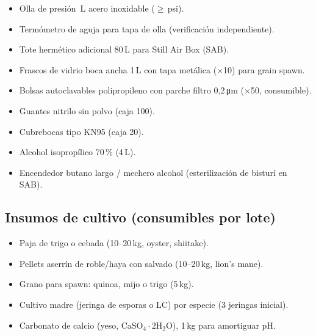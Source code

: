 \begin{itemize}[leftmargin=*,itemsep=0pt]
  \item Olla de presión \paramVolOllaPresion\,L acero inoxidable
        ($\geq$\paramPresionEster\,psi).
  \item Termómetro de aguja para tapa de olla (verificación independiente).
  \item Tote hermético adicional 80\,L para Still Air Box (SAB).
  \item Frascos de vidrio boca ancha 1\,L con tapa metálica ($\times$10)
        para grain spawn.
  \item Bolsas autoclavables polipropileno con parche filtro 0{,}2\,\si{\micro\meter}
        ($\times$50, consumible).
  \item Guantes nitrilo sin polvo (caja 100).
  \item Cubrebocas tipo KN95 (caja 20).
  \item Alcohol isopropílico 70\,\% (4\,L).
  \item Encendedor butano largo / mechero alcohol (esterilización
        de bisturí en SAB).
\end{itemize}

\subsection{Insumos de cultivo (consumibles por lote)}
\label{sec:bom:insumos}


\begin{itemize}[leftmargin=*,itemsep=0pt]
  \item Paja de trigo o cebada (10--20\,kg, oyster, shiitake).
  \item Pellets aserrín de roble/haya con salvado (10--20\,kg, lion's mane).
  \item Grano para spawn: quinoa, mijo o trigo (5\,kg).
  \item Cultivo madre (jeringa de esporas o LC) por especie (3
        jeringas inicial).
  \item Carbonato de calcio (yeso, CaSO$_4 \cdot 2$H$_2$O), 1\,kg para
        amortiguar pH.
\end{itemize}

